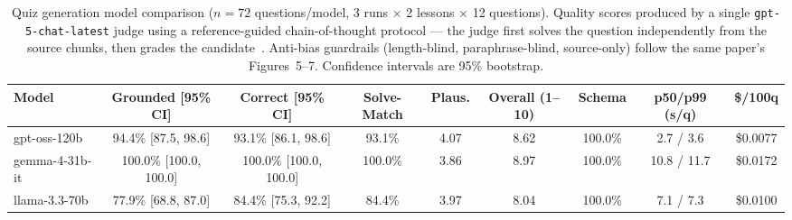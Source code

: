 \begin{table}[htbp]
\centering
\caption{Quiz generation model comparison ($n=72$ questions/model, 3 runs $\times$ 2 lessons $\times$ 12 questions). Quality scores produced by a single \texttt{gpt-5-chat-latest} judge using a reference-guided chain-of-thought protocol — the judge first solves the question independently from the source chunks, then grades the candidate~\cite{zheng2023judging}. Anti-bias guardrails (length-blind, paraphrase-blind, source-only) follow the same paper's Figures~5--7. Confidence intervals are 95\% bootstrap.}
\label{tab:gen_model_eval}
\renewcommand{\arraystretch}{1.3}
\begin{tabular}{|l|c|c|c|c|c|c|c|c|}
\hline
\textbf{Model} & \textbf{Grounded [95\% CI]} & \textbf{Correct [95\% CI]} & \textbf{Solve-Match} & \textbf{Plaus.} & \textbf{Overall (1--10)} & \textbf{Schema} & \textbf{p50/p99 (s/q)} & \textbf{\$/100q} \\
\hline
gpt-oss-120b & 94.4\% [87.5, 98.6] & 93.1\% [86.1, 98.6] & 93.1\% & 4.07 & 8.62 & 100.0\% & 2.7 / 3.6 & \$0.0077 \\
gemma-4-31b-it & 100.0\% [100.0, 100.0] & 100.0\% [100.0, 100.0] & 100.0\% & 3.86 & 8.97 & 100.0\% & 10.8 / 11.7 & \$0.0172 \\
llama-3.3-70b & 77.9\% [68.8, 87.0] & 84.4\% [75.3, 92.2] & 84.4\% & 3.97 & 8.04 & 100.0\% & 7.1 / 7.3 & \$0.0100 \\
\hline
\end{tabular}
\end{table}
